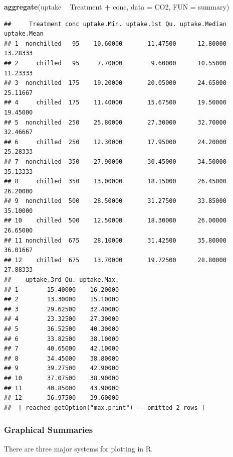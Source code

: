 \documentclass[
]{book}
\newenvironment{Shaded}{\begin{snugshade}}{\end{snugshade}}
\newcommand{\DataTypeTok}[1]{\textcolor[rgb]{0.13,0.29,0.53}{#1}}
\newcommand{\KeywordTok}[1]{\textcolor[rgb]{0.13,0.29,0.53}{\textbf{#1}}}
\newcommand{\NormalTok}[1]{#1}
\newcommand{\OperatorTok}[1]{\textcolor[rgb]{0.81,0.36,0.00}{\textbf{#1}}}
\newcommand{\StringTok}[1]{\textcolor[rgb]{0.31,0.60,0.02}{#1}}
\theoremstyle{definition}
\theoremstyle{definition}
\theoremstyle{definition}
\theoremstyle{remark}
\begin{document}
\begin{Shaded}
\begin{Highlighting}[]
\KeywordTok{aggregate}\NormalTok{(uptake }\OperatorTok{~}\StringTok{ }\NormalTok{Treatment }\OperatorTok{+}\StringTok{ }\NormalTok{conc, }\DataTypeTok{data =}\NormalTok{ CO2, }\DataTypeTok{FUN =}\NormalTok{ summary)}
\end{Highlighting}
\end{Shaded}

\begin{verbatim}
##     Treatment conc uptake.Min. uptake.1st Qu. uptake.Median uptake.Mean
## 1  nonchilled   95    10.60000       11.47500      12.80000    13.28333
## 2     chilled   95     7.70000        9.60000      10.55000    11.23333
## 3  nonchilled  175    19.20000       20.05000      24.65000    25.11667
## 4     chilled  175    11.40000       15.67500      19.50000    19.45000
## 5  nonchilled  250    25.80000       27.30000      32.70000    32.46667
## 6     chilled  250    12.30000       17.95000      24.20000    25.28333
## 7  nonchilled  350    27.90000       30.45000      34.50000    35.13333
## 8     chilled  350    13.00000       18.15000      26.45000    26.20000
## 9  nonchilled  500    28.50000       31.27500      33.85000    35.10000
## 10    chilled  500    12.50000       18.30000      26.00000    26.65000
## 11 nonchilled  675    28.10000       31.42500      35.80000    36.01667
## 12    chilled  675    13.70000       19.72500      28.80000    27.88333
##    uptake.3rd Qu. uptake.Max.
## 1        15.40000    16.20000
## 2        13.30000    15.10000
## 3        29.62500    32.40000
## 4        23.32500    27.30000
## 5        36.52500    40.30000
## 6        33.82500    38.10000
## 7        40.65000    42.10000
## 8        34.45000    38.80000
## 9        39.27500    42.90000
## 10       37.07500    38.90000
## 11       40.85000    43.90000
## 12       36.97500    39.60000
##  [ reached getOption("max.print") -- omitted 2 rows ]
\end{verbatim}

\hypertarget{graphical-summaries}{%
\subsubsection{Graphical Summaries}\label{graphical-summaries}}

There are three major systems for plotting in R.
\end{document}
